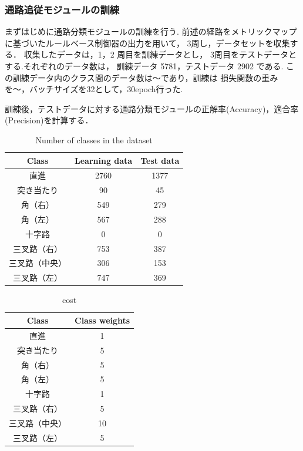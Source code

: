 \newpage
\subsubsection{通路追従モジュールの訓練}
まずはじめに通路分類モジュールの訓練を行う.
前述の経路をメトリックマップに基づいたルールベース制御器の出力を用いて，
3周し，データセットを収集する．
収集したデータは，1，2 周目を訓練データとし，
3周目をテストデータとする.それぞれのデータ数は，
訓練データ 5781，テストデータ 2902 である. 
この訓練データ内のクラス間のデータ数は〜であり，訓練は
損失関数の重みを〜，バッチサイズを32として，30epoch行った.

訓練後，テストデータに対する通路分類モジュールの正解率{(Accuracy)}，適合率{(Precision)}を計算する．
\begin{table}[htbp]
    \centering
    \caption{Number of classes in the dataset}\label{tab:target}
    \begin{tabular}{c|c|c}
    \hline
    Class & Learning data &Test data        \\
    \hline
    直進   & 2760 & 1377\\
    突き当たり   & 90 & 45 \\
    角（右） & 549 & 279 \\
    角（左）& 567 & 288 \\
    十字路 & 0 & 0 \\
    三叉路（右）& 753 & 387 \\
    三叉路（中央）& 306 & 153 \\
    三叉路（左） & 747 & 369 \\
    \hline
    \end{tabular}
\end{table}

\begin{table}[htbp]
    \centering
    \caption{cost}\label{tab:cost}
    \begin{tabular}{c|c}
    \hline
    Class & Class weights         \\
    \hline
    直進   & 1\\
    突き当たり   & 5\\
    角（右） & 5\\
    角（左）& 5 \\
    十字路 & 1  \\
    三叉路（右）& 5  \\
    三叉路（中央）& 10  \\
    三叉路（左） & 5  \\
    \hline
    \end{tabular}
\end{table}
